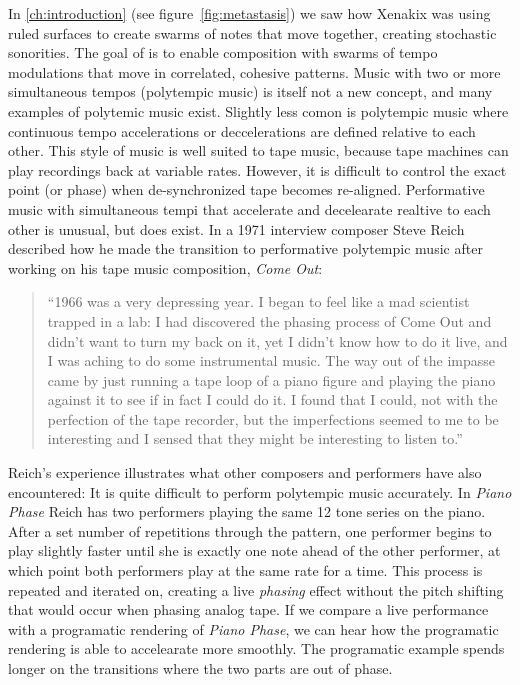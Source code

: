 In \autoref{ch:introduction} (see figure~\ref{fig:metastasis}) we saw
how Xenakix was using ruled surfaces to create swarms of notes that
move together, creating stochastic sonorities. The goal of \polytempic
is to enable composition with swarms of tempo modulations that move in
correlated, cohesive patterns. Music with two or more simultaneous
tempos (polytempic music) is itself not a new concept, and many
examples of polytemic music exist\cite{Greschak2003}. Slightly less
comon is polytempic music where continuous tempo accelerations or
deccelerations are defined relative to each other. This style of music
is well suited to tape music, because tape machines can play
recordings back at variable rates. However, it is difficult to control
the exact point (or phase) when de-synchronized tape becomes
re-aligned. Performative music with simultaneous tempi that accelerate
and decelearate realtive to each other is unusual, but does exist. In
a 1971 interview composer Steve Reich described how he made the
transition to performative polytempic music after working on his tape
music composition, \textit{Come Out}:
\begin{quotation}
  ``1966 was a very depressing year. I began to feel like a mad
  scientist trapped in a lab: I had discovered the phasing process
  of Come Out and didn't want to turn my back on it, yet I didn't know
  how to do it live, and I was aching to do some instrumental
  music. The way out of the impasse came by just running a tape loop
  of a piano figure and playing the piano against it to see if in fact
  I could do it. I found that I could, not with the perfection of the
  tape recorder, but the imperfections seemed to me to be interesting
  and I sensed that they might be interesting to listen to.''\cite{Nyman2015}
\end{quotation}
Reich's experience illustrates what other composers and performers
have also encountered: It is quite difficult to perform polytempic
music accurately. In \textit{Piano Phase} Reich has two performers
playing the same 12 tone series on the piano. After a set number of
repetitions through the pattern, one performer begins to play slightly
faster until she is exactly one note ahead of the other performer, at
which point both performers play at the same rate for a time. This
process is repeated and iterated on, creating a live \emph{phasing}
effect without the pitch shifting that would occur when phasing analog
tape. If we compare a live performance\cite{Huisman1989} with a
programatic rendering\cite{Chen2014} of \textit{Piano Phase}, we can
hear how the programatic rendering is able to accelearate more
smoothly. The programatic example spends longer on the transitions
where the two parts are out of phase.

